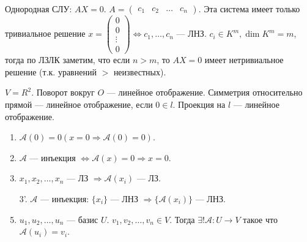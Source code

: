 Однородная СЛУ: $AX = 0$.  $A = \begin{pmatrix} c_1 & c_2 & \ldots & c_n \end{pmatrix}$. Эта система имеет только  тривиальное решение $x = \begin{pmatrix} 0 \\ 0 \\ \vdots \\ 0\end{pmatrix} \iff c_1, \ldots, c_n$ --- ЛНЗ. $c_i \in K^m, \dim K^m = m$, тогда по ЛЗЛК заметим, что если $n > m$, то  $AX=0$ имеет нетривиальное решение (т.к. уравнений $>$ неизвестных).
\begin{example}
   $V=R^2$. Поворот вокруг $O$ --- линейное отображение. Симметрия относительно прямой --- линейное отображение, если  $0 \in l$. Проекция на  $l$ --- линейное отображение.
\end{example}
\begin{properties}
    \begin{enumerate}
        \item $\mathcal{A}(0) = 0 (x = 0 \Rightarrow \mathcal{A}(0) = 0)$.
        \item $\mathcal{A}$ --- инъекция  $\iff \mathcal{A}(x) = 0 \Rightarrow x = 0$.
        \item $x_1, x_2, \ldots, x_n$ --- ЛЗ $\Rightarrow \mathcal{A}(x_i)$ --- ЛЗ.
        \item[3'.] $\mathcal{A}$ --- инъекция:  $\{x_i \}$ --- ЛНЗ  $\Rightarrow \{\mathcal{A}(x_i)\}$ --- ЛНЗ.
        \item  $u_1, u_2, \ldots, u_n$ --- базис $U$.  $v_1, v_2, \ldots, v_n \in V$. Тогда $\exists! \mathcal{A}\!: U \to V$ такое что  $\mathcal{A}(u_i) = v_i$.
    \end{enumerate}
\end{properties}
